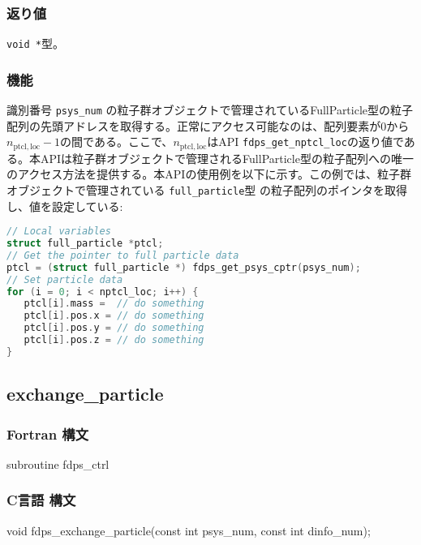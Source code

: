 \subsubsection*{返り値}
\texttt{void *}型。

\subsubsection*{機能}
識別番号 \texttt{psys\_num} の粒子群オブジェクトで管理されているFullParticle型の粒子配列の先頭アドレスを取得する。正常にアクセス可能なのは、配列要素が0から$n_{\mathrm{ptcl,loc}}-1$の間である。ここで、$n_{\mathrm{ptcl,loc}}$はAPI \texttt{fdps\_get\_nptcl\_loc}の返り値である。本APIは粒子群オブジェクトで管理されるFullParticle型の粒子配列への唯一のアクセス方法を提供する。本APIの使用例を以下に示す。この例では、粒子群オブジェクトで管理されている \texttt{full\_particle}型 の粒子配列のポインタを取得し、値を設定している:
\begin{lstlisting}[language=C,caption=API \texttt{fdps\_get\_psys\_cptr}の使用例]
// Local variables
struct full_particle *ptcl;
// Get the pointer to full particle data
ptcl = (struct full_particle *) fdps_get_psys_cptr(psys_num);
// Set particle data
for (i = 0; i < nptcl_loc; i++) {
   ptcl[i].mass =  // do something
   ptcl[i].pos.x = // do something
   ptcl[i].pos.y = // do something
   ptcl[i].pos.z = // do something
}
\end{lstlisting}

\clearpage


\subsection{exchange\_particle}
\subsubsection*{Fortran 構文}
\begin{screen}
\begin{spverbatim}
subroutine fdps_ctrl%
\end{spverbatim}
\end{screen}

\subsubsection*{C言語 構文}
\begin{screen}
\begin{spverbatim}
void fdps_exchange_particle(const int psys_num,
                            const int dinfo_num);
\end{spverbatim}
\end{screen}

